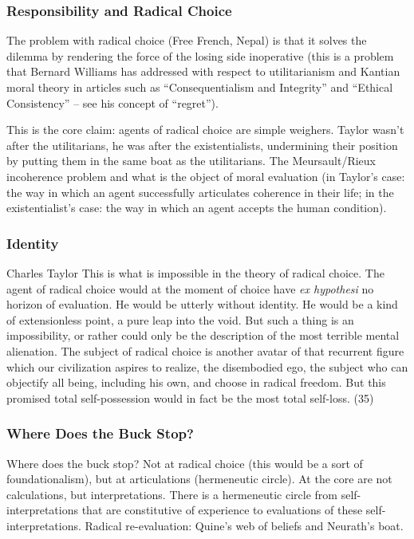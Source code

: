 \documentclass[xcolor=dvipsnames]{beamer}
\begin{document}
\begin{frame}
  \frametitle{Responsibility and Radical Choice}
  The problem with radical choice (Free French, Nepal) is that it
  solves the dilemma by rendering the force of the losing side
  inoperative (this is a problem that Bernard Williams has
  addressed with respect to utilitarianism and Kantian moral
  theory in articles such as ``Consequentialism and Integrity''
  and ``Ethical Consistency'' -- see his concept of ``regret'').

\bigskip

This is the core claim: agents of radical choice are simple
weighers. Taylor wasn't after the utilitarians, he was after the
existentialists, undermining their position by putting them in the
same boat as the utilitarians. The Meursault/Rieux incoherence
problem and what is the object of moral evaluation (in Taylor's
case: the way in which an agent successfully articulates coherence
in their life; in the existentialist's case: the way in which an
agent accepts the human condition).
\end{frame}

\begin{frame}
  \frametitle{Identity}
  \begin{block}{Charles Taylor}
    This is what is impossible in the theory of radical choice.
    The agent of radical choice would at the moment of choice have
    \emph{ex hypothesi} no horizon of evaluation. He would be utterly
    without identity. He would be a kind of extensionless point, a
    pure leap into the void. But such a thing is an impossibility,
    or rather could only be the description of the most terrible
    mental alienation. The subject of radical choice is another
    avatar of that recurrent figure which our civilization aspires
    to realize, the disembodied ego, the subject who can objectify
    all being, including his own, and choose in radical freedom.
    But this promised total self-possession would in fact be the
    most total self-loss. (35)
  \end{block}
\end{frame}

\begin{frame}
  \frametitle{Where Does the Buck Stop?}
Where does the buck stop? Not at radical choice (this would be a
sort of foundationalism), but at articulations (hermeneutic
circle). At the core are not calculations, but interpretations.
There is a hermeneutic circle from self-interpretations that are
constitutive of experience to evaluations of these
self-interpretations. Radical re-evaluation: Quine's web of
beliefs and Neurath's boat.  
\end{frame}
\end{document}
